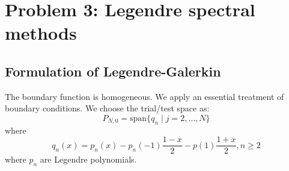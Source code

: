 \documentclass[12pt, fullpage,letterpaper]{article}
\begin{document}
\section{Problem 3: Legendre spectral methods}
\subsection{Formulation of Legendre-Galerkin}
The boundary function is homogeneous. We apply an essential treatment of boundary conditions. 
We choose the trial/test space as:
\begin{equation}
    P_{N,0} = \text{span}\{ q_n \mid j =2, \dots , N\}
\end{equation}
where
\begin{equation}
    q_n(x) = p_n(x) - p_n(-1)\frac{1-x}{2} - p(1)\frac{1+x}{2}, n \geq 2
\end{equation}
where $p_n$ are Legendre polynomials.
\end{document}
